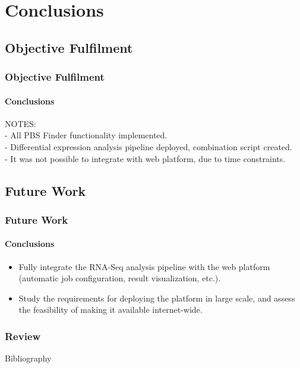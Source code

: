 \documentclass{beamer}
\begin{document}

\section{Conclusions}
\subsection{Objective Fulfilment}
\begin{frame}
  \frametitle{Objective Fulfilment}
  \framesubtitle{Conclusions}

NOTES:\\
- All PBS Finder functionality implemented.\\
- Differential expression analysis pipeline deployed, combination script created.\\
- It was not possible to integrate with web platform, due to time constraints.\\

\end{frame}

\subsection{Future Work}
\begin{frame}
  \frametitle{Future Work}
  \framesubtitle{Conclusions}

\begin{itemize}
\item
Fully integrate the RNA-Seq analysis pipeline with the web platform (automatic
job configuration, result visualization, etc.).\\ \vspace{1.2cm}

\item
Study the requirements for deploying the platform in large scale, and assess the
feasibility of making it available internet-wide.
\end{itemize}


\end{frame}


\begin{frame}
  \frametitle{Review}
  \tableofcontents
\end{frame}

\begin{frame}{Bibliography}
  
  
\end{frame}

\frame{\titlepage}
\end{document}
